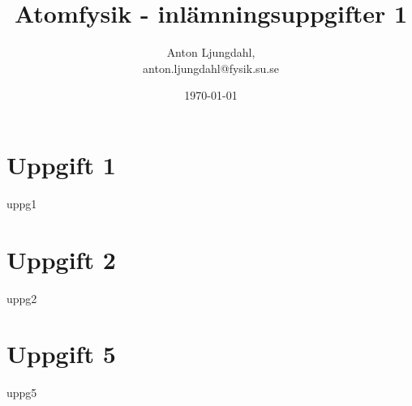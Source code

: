\documentclass[12pt,a4paper]{article}
\numberwithin{equation}{section}
\begin{document}
\author{Anton Ljungdahl, \\
\small{anton.ljungdahl@fysik.su.se}}
\title{Atomfysik - inlämningsuppgifter 1}
\date{\today}
\maketitle

\section{   Uppgift 1}
{uppg1}
\section{   Uppgift 2}
{uppg2}
\section{   Uppgift 5}
{uppg5}
\end{document}
